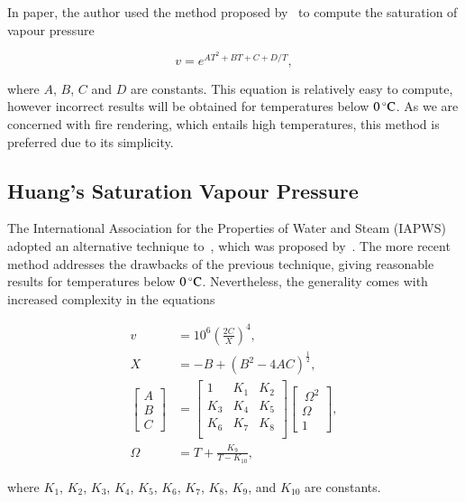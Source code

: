 In \cite{Ciddor:1996} paper, the author used the method proposed by~\cite{Davis:1992} to compute the saturation of vapour pressure

\begin{equation}
\label{eq:davis_v}
v = e^{AT^2 + BT + C + D/T},
\end{equation}

where $A$, $B$, $C$ and $D$ are constants.
This equation is relatively easy to compute, however incorrect results will be obtained for temperatures below $0\,^{\circ}{\rm C}$.
As we are concerned with fire rendering, which entails high temperatures, this method is preferred due to its simplicity.

\subsection{Huang's Saturation Vapour Pressure}
\label{subsec:huang_v}

The International Association for the Properties of Water and Steam (IAPWS) adopted an alternative technique to~\cite{Davis:1992}, which was proposed by~\cite{Huang:1998}.
The more recent method addresses the drawbacks of the previous technique, giving reasonable results for temperatures below $0\,^{\circ}{\rm C}$.
Nevertheless, the generality comes with increased complexity in the equations

\begin{align}
\label{eq:huang_v}
v &= 10^{6} \left( \frac{2C}{X} \right)^4, \\
X &= -B + \left( B^2 - 4AC \right)^{\frac{1}{2}}, \\
\begin{bmatrix}
A \\
B \\
C
\end{bmatrix} &=
\begin{bmatrix}
1 & K_1 & K_2 \\
K_3 & K_4 & K_5 \\
K_6 & K_7 & K_8 \\
\end{bmatrix} 
\begin{bmatrix}
~\Omega^2 \\
\Omega \\
1
\end{bmatrix}, \\
\Omega &= T + \frac{K_9}{T - K_{10}},
\end{align}

where $K_1$, $K_2$, $K_3$, $K_4$, $K_5$, $K_6$, $K_7$, $K_8$, $K_9$, and $K_{10}$ are constants.

